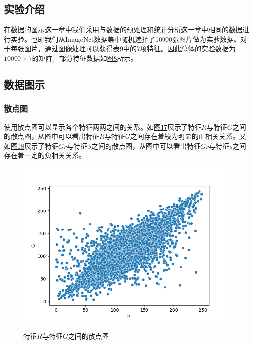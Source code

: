 \documentclass[UTF8]{ctexart}
\begin{document}
	\subsection{实验介绍} 
	
	在数据的图示这一章中我们采用与数据的预处理和统计分析这一章中相同的数据进行实验。也即我们从ImageNet数据集中随机选择了10000张图片做为实验数据。对于每张图片，通过图像处理可以获得\hyperref[Chart.9]{表9}中的7项特征。因此总体的实验数据为$10000 \times 7$的矩阵，部分特征数据如\hyperref[Fig.8]{图8}所示。
	
	\subsection{数据图示}
	
	\subsubsection{散点图}
	使用散点图可以显示各个特征两两之间的关系。如\hyperref[Fig.17]{图17}展示了特征$R$与特征$G$之间的散点图，从图中可以看出特征$R$与特征$G$之间存在着较为明显的正相关关系。又如\hyperref[Fig.18]{图18}展示了特征$Gr$与特征$S$之间的散点图，从图中可以看出特征$Gr$与特征$s$之间存在着一定的负相关关系。
	
	\begin{figure}[htbp]
		\centering
		\caption{特征$R$与特征$G$之间的散点图}
		\includegraphics[width=1.0\textwidth]{scatter_r_g.png}
		\label{Fig.17}
	\end{figure}
\end{document}
